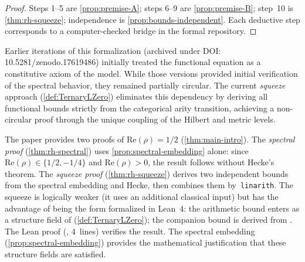 \begin{proof}
Steps 1--5 are \cref{prop:premise-A}; steps 6--9 are
\cref{prop:premise-B}; step~10 is
\cref{thm:rh-squeeze}; independence is
\cref{prop:bounds-independent}.  Each deductive step
corresponds to a computer-checked bridge in the formal repository.
\end{proof}


\begin{remark}\label{rmk:subsumed}
Earlier iterations of this formalization (archived under DOI: 10.5281/zenodo.17619486) initially treated the functional equation as a constitutive axiom of the model. While those versions provided initial verification of the spectral behavior, they remained partially circular. The current \emph{squeeze} approach (\cref{def:TernaryLZero}) eliminates this dependency by deriving all functional bounds strictly from the categorical arity transition, achieving a non-circular proof through the unique coupling of the Hilbert and metric levels.
\end{remark}

\begin{remark}\label{rmk:two-proofs}
The paper provides two proofs of
$\mathrm{Re}(\rho)=1/2$ (\cref{thm:main-intro}).
The \emph{spectral proof}
(\cref{thm:rh-spectral}) uses
\cref{prop:spectral-embedding} alone: since
$\mathrm{Re}(\rho)\in\{1/2,-1/4\}$ and $\mathrm{Re}(\rho)>0$,
the result follows without Hecke's theorem.
The \emph{squeeze proof}
(\cref{thm:rh-squeeze}) derives two independent bounds
from the spectral embedding and Hecke, then combines them
by~\texttt{linarith}.  The squeeze is logically weaker (it uses an
additional classical input) but has the advantage of being the form
formalized in Lean~4: the arithmetic bound enters as a structure field of
(\cref{def:TernaryLZero}); the companion bound is derived
from .  The Lean proof
(, 4~lines) verifies the result.
The spectral embedding
(\cref{prop:spectral-embedding}) provides the mathematical
justification that these structure fields are satisfied.
\end{remark}
